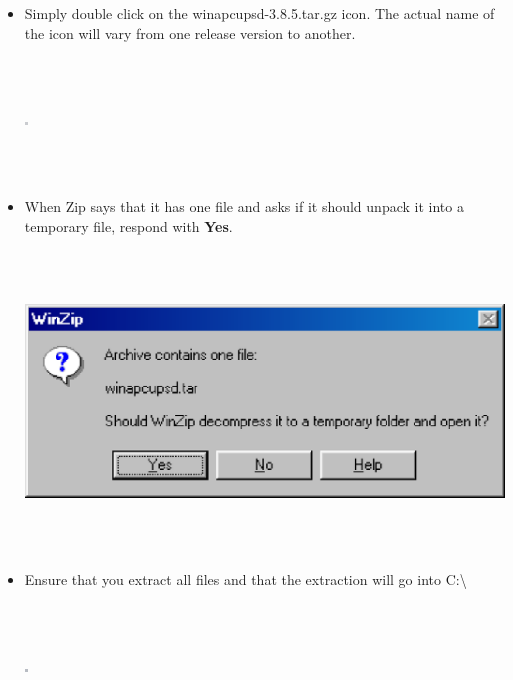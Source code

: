 \begin{itemize}
\item Simply double click on the winapcupsd-3.8.5.tar.gz icon.  The actual
name of the icon will vary from one release version to another.  

\footnotesize
\begin{verbatim}
     
     
\end{verbatim}
\normalsize

\includegraphics{./wininstall3.eps}  

\footnotesize
\begin{verbatim}
     
     
\end{verbatim}
\normalsize

\item When Zip says that it has one file and asks if it should unpack it into
a temporary file, respond with {\bf Yes}.  

\footnotesize
\begin{verbatim}
     
     
\end{verbatim}
\normalsize

\includegraphics{./wininstall4.eps}  

\footnotesize
\begin{verbatim}
     
     
\end{verbatim}
\normalsize

\item Ensure that you extract all files and that the extraction will go into
C:\textbackslash{}  

\footnotesize
\begin{verbatim}
     
     
\end{verbatim}
\normalsize

\includegraphics{./wininstall5.eps}  

\footnotesize
\begin{verbatim}
     
     
\end{verbatim}
\normalsize

\end{itemize}

